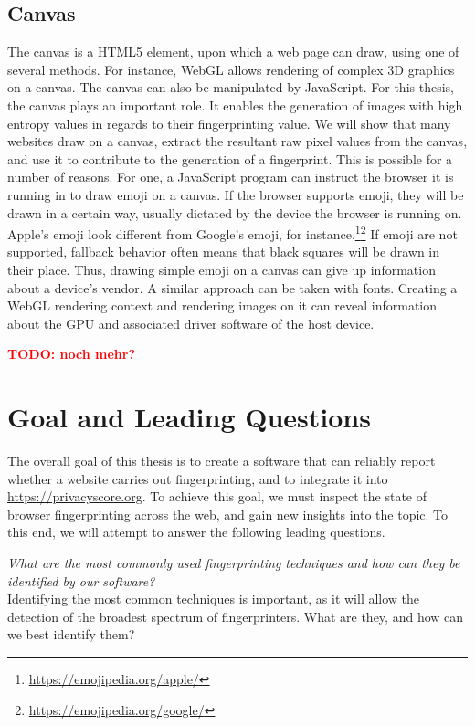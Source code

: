 \documentclass[
    fontsize=12pt,
    headings=small,
    parskip=half,
    bibliography=totoc,
    numbers=noenddot,
    open=any
    ]{scrreprt}
\newcommand{\todo}[1]{\textcolor{red}{\textbf{TODO: #1}}}
\begin{document}
\subsection{Canvas}
\label{fundamentals:canvas}
The canvas \cite{w3ccanvas} is a HTML5 element, upon which a web page can draw,
using one of several methods. For instance, WebGL allows rendering of complex
3D graphics on a canvas.
The canvas can also be manipulated by JavaScript. For this thesis,
the canvas plays an important role. It enables the generation
of images with high entropy values in regards to their fingerprinting value.
We will show that many websites draw on a canvas, extract the resultant raw pixel
values from the canvas, and use it to contribute to the generation of a fingerprint.
This is possible for a number of reasons. For one, a JavaScript program
can instruct the browser it is running in to draw emoji on a canvas.
If the browser supports emoji, they will be drawn in a certain way, usually dictated
by the device the browser is running on. Apple's emoji look different from Google's
emoji, for instance.\footnote{\url{https://emojipedia.org/apple/}}\footnote{\url{https://emojipedia.org/google/}}
If emoji are not supported, fallback behavior often means that black squares will
be drawn in their place.
Thus, drawing simple emoji on a canvas can give up information about a device's vendor.
A similar approach can be taken with fonts.
Creating a WebGL rendering context and rendering images on it can reveal
information about the GPU and associated driver software of the host device.

\todo{noch mehr?}

\section{Goal and Leading Questions}
The overall goal of this thesis is to create a software that can reliably report whether a website carries out
fingerprinting, and to integrate it into \url{https://privacyscore.org}. To achieve this goal,
we must inspect the state of browser fingerprinting across the web, and gain new insights into the topic.
To this end, we will attempt to answer the following leading questions.

\textit{What are the most commonly used fingerprinting techniques and how can they be identified by our software?}\\
Identifying the most common techniques is important, as it will allow the detection of the broadest spectrum
of fingerprinters. What are they, and how can we best identify them?
\end{document}
